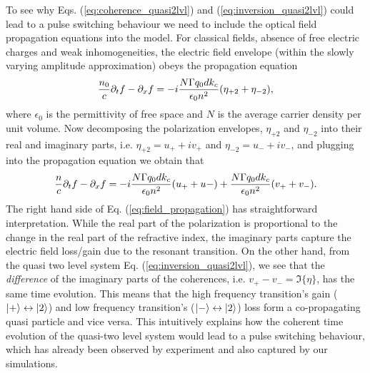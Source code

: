 \documentclass[]{spie}  %
\begin{document}
To see why Eqs. (\ref{eq:coherence_quasi2lvl}) and
(\ref{eq:inversion_quasi2lvl}) could lead to a pulse switching behaviour we
need to include the optical field propagation equations into the model. For
classical fields, absence of free electric charges and weak inhomogeneities,
the electric field envelope (within the slowly varying amplitude approximation)
obeys the propagation equation \begin{align} \frac{n_0}{c} \partial_t f - \partial_x f =
-i\frac{N \Gamma q_0d k_c}{\epsilon_0 n^2}(\eta_{+2}+\eta_{-2}), \end{align}
where $\epsilon_0$ is the permittivity of free space and $N$ is the average
carrier density per unit volume. Now decomposing the polarization envelopes,
$\eta_{+2}$ and $\eta_{-2}$ into their real and imaginary parts, i.e.
$\eta_{+2} = u_{+}+iv_{+}$ and $\eta_{-2} = u_{-}+iv_{-}$, and plugging into
the propagation equation we obtain that \begin{align}
\label{eq:field_propagation} \frac{n}{c} \partial_t f - \partial_x f = -i\frac{N \Gamma
 	q_0d k_c}{\epsilon_0 n^2}(u_{+}+u{-}) + \frac{N \Gamma q_0d k_c}{\epsilon_0
 	n^2}(v_{+}+v_{-}).  \end{align} The right hand side of Eq.
(\ref{eq:field_propagation}) has straightforward interpretation. While the real
part of the polarization is proportional to the change in the real part of the
refractive index, the imaginary parts capture the electric field loss/gain due
to the resonant transition. On the other hand, from the quasi two level system
Eq. (\ref{eq:inversion_quasi2lvl}), we see that the \emph{difference} of the
imaginary parts of the coherences, i.e. $v_{+}-v_{-} = \Im\{\eta\}$, has the
same time evolution. This means that the high frequency transition's gain
($\ket{+}\leftrightarrow\ket{2}$) and low frequency transition's
($\ket{-}\leftrightarrow\ket{2}$) loss form a co-propagating quasi particle and
vice versa. This intuitively explains how the coherent time evolution of the
quasi-two level system would lead to a pulse switching behaviour, which has
already been observed by experiment\cite{burghoff2015evaluating} and also
captured by our simulations.
\end{document}
